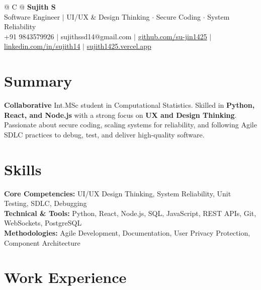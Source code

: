 \documentclass[a4paper,11pt]{article}
\newcommand{\ulink}[2]{\href{#1}{#2}}
\begin{document}
\pagestyle{empty}

\begin{tabularx}{\linewidth}{@{} C @{}}
{\color[HTML]{000000}\fontsize{30}{35}\selectfont\bfseries Sujith S} \\[5pt]
{\fontsize{10.5}{12.5}\selectfont\color[HTML]{3A3A3A}
Software Engineer $|$ UI/UX \& Design Thinking $\cdot$ Secure Coding $\cdot$ System Reliability} \\[6pt]
{\fontsize{9.5}{11.5}\selectfont\textcolor[HTML]{3A3A3A}{+91 9843579926 $|$ sujithssd14@gmail.com $|$ \ulink{https://github.com/su-jin1425}{github.com/su-jin1425} $|$ \ulink{https://linkedin.com/in/sujith14}{linkedin.com/in/sujith14} $|$ \ulink{https://sujith1425.vercel.app}{sujith1425.vercel.app}}}
\end{tabularx}

\section{Summary}
\vspace{2pt}

{\color[HTML]{0A0A0A}\fontsize{11}{14}\selectfont
\textbf{Collaborative} Int.MSc student in Computational Statistics. Skilled in \textbf{Python, React, and Node.js} with a strong focus on \textbf{UX and Design Thinking}. Passionate about secure coding, scaling systems for reliability, and following Agile SDLC practices to debug, test, and deliver high-quality software.}

\section{Skills}
\vspace{2pt}

{\color[HTML]{0A0A0A}\fontsize{11}{14}\selectfont
\textbf{Core Competencies:} UI/UX Design Thinking, System Reliability, Unit Testing, SDLC, Debugging \\[2pt]
\textbf{Technical \& Tools:} Python, React, Node.js, SQL, JavaScript, REST APIs, Git, WebSockets, PostgreSQL \\[2pt]
\textbf{Methodologies:} Agile Development, Documentation, User Privacy Protection, Component Architecture}

\section{Work Experience}
\vspace{2pt}
\end{document}
